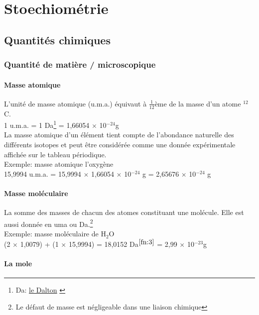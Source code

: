 \documentclass[10pt,a4paper]{book}
\begin{document}
\chapter{Stoechiométrie}

\section{Quantités chimiques}

\subsection{Quantité de matière / microscopique}

\subsubsection{Masse atomique}

L'unité de masse atomique (u.m.a.) équivaut à $ \frac{1}{12} $ème de la masse d'un atome $^{12}$C. \\ 
1 u.m.a. = 1 Da\footnote{Da: \href{https://fr.wikipedia.org/wiki/Unit\%C3\%A9_de_masse_atomique_unifi\%C3\%A9e\#En_biochimie}{le Dalton} \label{fn:3}} = 1,66054 $\times$ 10$^{-24}$g \\
La masse atomique d'un élément tient compte de l'abondance naturelle des différents isotopes et peut être considérée comme une donnée expérimentale affichée sur le tableau périodique.\\
Exemple: masse atomique l'oxygène \\
15,9994 u.m.a. = 15,9994 $\times$ 1,66054 $\times$ 10$^{-24}$ g = 2,65676 $\times$ 10$^{-24}$ g

\subsubsection{Masse moléculaire}

La somme des masses de chacun des atomes constituant une molécule. Elle est aussi donnée en uma ou Da.\footnote{Le défaut de masse est négligeable dans une liaison chimique}\\
Exemple: masse moléculaire de H$_2$O \\
(2 $\times$ 1,0079) + (1 $\times$ 15,9994) = 18,0152 Da$^{\ref{fn:3}}$ = 2,99 $\times$ 10$^{-23}$g

\subsubsection{La mole}
\end{document}
